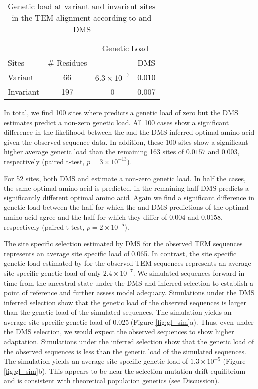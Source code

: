 \begin{table}
  \centering
  \caption{Genetic load at variant and invariant sites in the TEM alignment according to \selac and DMS}
  \begin{tabular}{lccc}
    \hline
			& 		& \multicolumn{2}{c}{Genetic Load}  \\ 
    Sites 		& \# Residues	& \multicolumn{1}{c}{\selac} & \multicolumn{1}{c}{DMS} \\ \hline 
    Variant	&	66	& $6.3\times10^{-7}$ & 0.010  \\
    Invariant		& 	197	& 0 & 0.007 \\
  \end{tabular}
  \label{tab:selection}
\end{table}


In total, we find 100 sites where \selac predicts a genetic load of zero but the DMS estimates predict a non-zero genetic load.
All 100 cases show a significant difference in the likelihood between the \selac and the DMS inferred optimal amino acid given the observed sequence data.
In addition, these 100 sites show a significant higher average genetic load than the remaining 163 sites of $0.0157$ and $0.003$, respectively (paired t-test, $p = 3\times10^{-13}$).

For 52 sites, both DMS and \selac estimate a non-zero genetic load.
In half the cases, the same optimal amino acid is predicted, in the remaining half DMS predicts a significantly different optimal amino acid.
Again we find a significant difference in genetic load between the half for which the \selac and DMS predictions of the optimal amino acid agree and the half for which they differ of $0.004$ and $0.0158$, respectively (paired t-test, $p = 2\times10^{-5}$).

The site specific selection estimated by DMS for the observed TEM sequences represents an average site specific load of 0.065.
In contrast, the site specific genetic load estimated by \selac for the observed TEM sequences represents an average site specific genetic load of only $2.4\times 10^{-7}$.
We simulated sequences forward in time from the ancestral state under the DMS and \selac inferred selection to establish a point of reference and further assess model adequacy.
Simulations under the DMS inferred selection show that the genetic load of the observed sequences is larger than the genetic load of the simulated sequences.
The simulation yields an average site specific genetic load of 0.025 (Figure \ref{fig:gl_sim}a).
Thus, even under the DMS selection, we would expect the observed sequences to show higher adaptation.
Simulations under the \selac inferred selection show that the genetic load of the observed sequences is less than the genetic load of the simulated sequences.
The simulation yields an average site specific genetic load of $1.3 \times 10^{-5}$ (Figure \ref{fig:gl_sim}b).
This appears to be near the selection-mutation-drift equilibrium and is consistent with theoretical population genetics (see Discussion).

